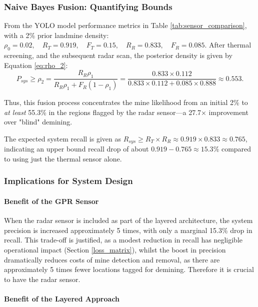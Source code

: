     \subsubsection{Naive Bayes Fusion: Quantifying Bounds}
    
        From the YOLO model performance metrics in Table \ref{tab:sensor_comparison}, with a 2\% prior landmine density: $\rho_0 = 0.02,\quad R_T = 0.919,\quad F_T = 0.15,\quad R_R = 0.833,\quad F_R = 0.085.$ After thermal screening, and the subsequent radar scan, the posterior density is given by Equation \ref{eq:rho_2}:
        \[
        P_{sys} \geq \rho_2 = \frac{R_R \rho_1}{R_R \rho_1 + F_R (1-\rho_1)} = \frac{0.833 \times 0.112}{0.833 \times 0.112 + 0.085 \times 0.888} \approx 0.553.
        \]
        
        Thus, this fusion process concentrates the mine likelihood from an initial 2\% to \textit{at least} 55.3\% in the regions flagged by the radar sensor—a  27.7× improvement over "blind" demining.
        
        The expected system recall is given as $R_{sys} \geq R_T \times R_R \approx 0.919 \times 0.833 \approx 0.765$, indicating an upper bound recall drop of about $0.919 - 0.765 \approx 15.3\%$ compared to using just the thermal sensor alone.


    \subsubsection{Implications for System Design}

        \paragraph{Benefit of the GPR Sensor}
        
            
            When the radar sensor is included as part of the layered architecture, the system precision is increased approximately 5 times, with only a marginal 15.3\% drop in recall. This trade-off is justified, as a modest reduction in recall has negligible operational impact (Section \ref{loss_matrix}), whilst the boost in precision dramatically reduces costs of mine detection and removal, as there are approximately 5 times fewer locations tagged for demining. Therefore it is crucial to have the radar sensor.
                
        \paragraph{Benefit of the Layered Approach}
        
